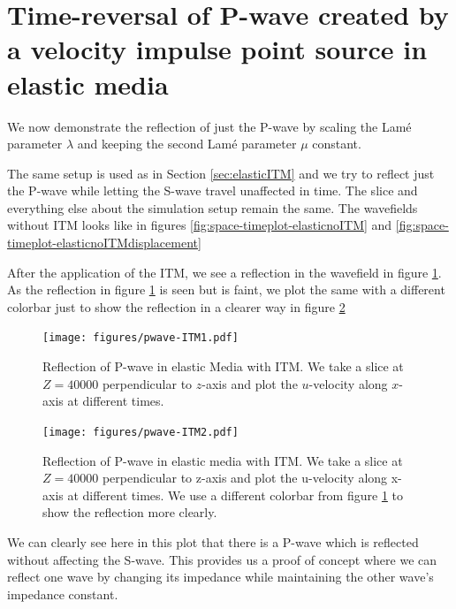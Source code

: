 \section{Time-reversal of P-wave created by a velocity impulse point source in elastic media} \label{sec:elasticITMpwave}
We now demonstrate the reflection of just the P-wave by scaling the Lam\'{e} parameter $\lambda$ and keeping the second Lam\'{e} parameter $\mu$ constant.
\par The same setup is used as in Section \ref{sec:elasticITM} and we try to reflect just the P-wave while letting the S-wave travel unaffected in time. The slice
and everything else about the simulation setup remain the same. The wavefields without \ac{ITM} looks like in figures \ref{fig:space-timeplot-elasticnoITM} and
\ref{fig:space-timeplot-elasticnoITMdisplacement}
\par After the application of the \ac{ITM}, we see a reflection in the wavefield in figure \ref{fig:space-timeplot-pwave}.
As the reflection in figure \ref{fig:space-timeplot-pwave} is seen but is faint, we plot the same with a different colorbar just to show the reflection in a clearer
way in figure \ref{fig:space-timeplot-pwave2}
\begin{figure}[!htpb]
    \centering
    \texttt{[image: figures/pwave-ITM1.pdf]}
    \caption{Reflection of P-wave in elastic Media with \ac{ITM}. We take a slice at $Z=40000$ perpendicular to $z$-axis
    and plot the $u$-velocity along $x$-axis at different times.}
    \label{fig:space-timeplot-pwave}
\end{figure}

\begin{figure}[!htpb] %
    \centering
    \texttt{[image: figures/pwave-ITM2.pdf]}
    \caption{Reflection of P-wave in elastic media with \ac{ITM}. We take a slice at $Z=40000$ perpendicular to z-axis
    and plot the u-velocity along x-axis at different times. We use a different colorbar from figure \ref{fig:space-timeplot-pwave} to show the reflection more clearly.}
    \label{fig:space-timeplot-pwave2}
\end{figure}
\par We can clearly see here in this plot that there is a P-wave which is reflected without affecting the S-wave. This provides us a proof of concept where we 
can reflect one wave by changing its impedance while maintaining the other wave's impedance constant.

